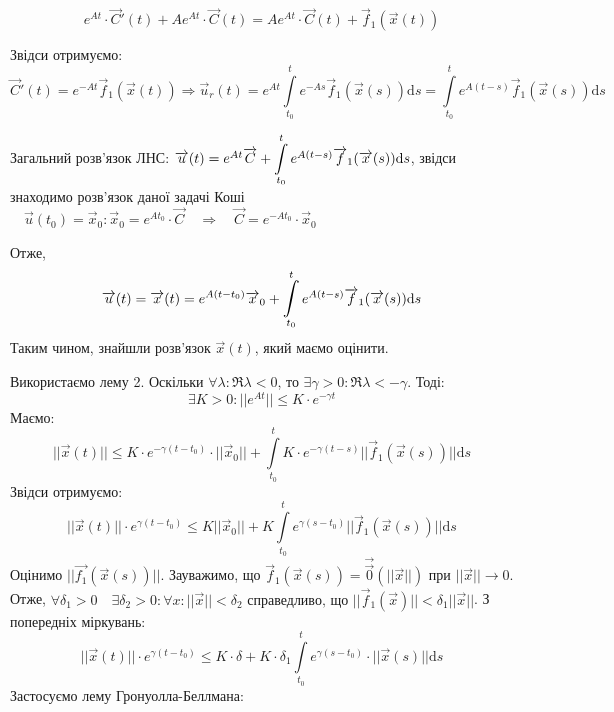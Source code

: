 \documentclass[14pt,a4paper]{scrartcl}
\theoremstyle{definition}
\theoremstyle{definition}
\theoremstyle{definition}
\begin{document}
$$e^{At} \cdot \overrightarrow{C}'(t) + Ae^{At} \cdot \overrightarrow{C}(t) = Ae^{At} \cdot \overrightarrow{C}(t) + \overrightarrow{f}_1(\overrightarrow{x}(t))$$

Звідси отримуємо: $$\overrightarrow{C}'(t) \!=\! e^{-At} \overrightarrow{f}_1(\overrightarrow{x}(t)) \Longrightarrow \overrightarrow{u}_r(t) \!=\!
e^{At}  \int\limits_{t_0}^{t} e^{-As} \overrightarrow{f}_1(\overrightarrow{x}(s))\mathrm{d}s \!=\!\!\! \int\limits_{t_0}^{t} e^{A(t-s)}\overrightarrow{f}_1(\overrightarrow{x}(s))\mathrm{d}s
$$

Загальний розв'язок ЛНС: $\overrightarrow{u}(t) = e^{At}  \overrightarrow{C} + \mathop{\mathlarger{\int}}\limits_{t_0}^{t} e^{A(t - s)} \overrightarrow{f}_1(\overrightarrow{x}(s))\mathrm{d}s$, звідси знаходимо розв'язок даної задачі Коші $\quad \overrightarrow{u}(t_0) = \overrightarrow{x}_0 : \overrightarrow{x}_0 = e^{At_0} \cdot \overrightarrow{C} \quad \Longrightarrow \quad \overrightarrow{C} = e^{-At_0} \cdot \overrightarrow{x}_0$

Отже, $$\overrightarrow{u}(t) = \overrightarrow{x}(t) = e^{A(t - t_0)}\overrightarrow{x}_0 + \mathop{\mathlarger{\int}}\limits_{t_0}^{t} e^{A(t - s)} \overrightarrow{f}_1(\overrightarrow{x}(s))\mathrm{d}s$$
Таким чином, знайшли розв'язок $\overrightarrow{x}(t)$, який маємо оцінити.

Використаємо лему 2. Оскільки $\forall \lambda : \Re \lambda < 0$, то $\exists \gamma > 0 : \Re \lambda < -\gamma$. Тоді: $$\exists K > 0 : ||e^{At}|| \leq K \cdot e^{-\gamma t}$$
Маємо: $$ ||\overrightarrow{x}(t)|| \leq K \cdot e^{-\gamma(t - t_0)} \cdot || \overrightarrow{x}_0|| + \int\limits_{t_0}^{t} K \cdot e^{-\gamma(t - s)} ||\overrightarrow{f}_1(\overrightarrow{x}(s))||\mathrm{d}s$$
Звідси отримуємо: $$||\overrightarrow{x}(t)|| \cdot e^{\gamma(t - t_0)} \leq K||\overrightarrow{x}_0|| + K \int\limits_{t_0}^{t} e^{\gamma(s - t_0)} ||\overrightarrow{f}_1(\overrightarrow{x}(s))||\mathrm{d}s$$
Оцінимо $||\overrightarrow{f_1}(\overrightarrow{x}(s))||$. Зауважимо, що $\overrightarrow{f}_1(\overrightarrow{x}(s)) = \overrightarrow{\overrightarrow{0}}(||\overrightarrow{x}||)$ при $||\overrightarrow{x}|| \longrightarrow 0$. Отже,
$\forall \delta_1 > 0 \quad \exists \delta_2 > 0 : \forall x : ||\overrightarrow{x}|| < \delta_2 \text{ справедливо, що } ||\overrightarrow{f}_1(\overrightarrow{x})|| < \delta_1 ||\overrightarrow{x}||$. З попередніх міркувань: $$||\overrightarrow{x}(t)|| \cdot e^{\gamma(t - t_0)} \leq K \cdot \delta + K \cdot \delta_1 \int\limits_{t_0}^{t} e^{\gamma(s - t_0)} \cdot ||\overrightarrow{x}(s)||\mathrm{d}s$$
Застосуємо лему Гронуолла-Беллмана:
\end{document}

